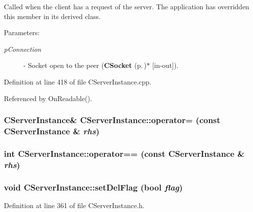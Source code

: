 Called when the client has a request of the server. The application has overridden this member in its derived class.\begin{Desc}
\item[Parameters: ]\par
\begin{description}
\item[{\em 
p\-Connection}]- Socket open to the peer ({\bf CSocket} {\rm (p.\,\pageref{classCSocket})}$\ast$ [in-out]). \end{description}
\end{Desc}


Definition at line 418 of file CServer\-Instance.cpp.

Referenced by On\-Readable().
\subsubsection{\setlength{\rightskip}{0pt plus 5cm}CServer\-Instance\& CServer\-Instance::operator= (const CServer\-Instance \& {\em rhs})\hspace{0.3cm}{\tt  [private]}}\label{classCServerInstance_c1}


\subsubsection{\setlength{\rightskip}{0pt plus 5cm}int CServer\-Instance::operator== (const CServer\-Instance \& {\em rhs})\hspace{0.3cm}{\tt  [private]}}\label{classCServerInstance_c2}


\subsubsection{\setlength{\rightskip}{0pt plus 5cm}void CServer\-Instance::set\-Del\-Flag (bool {\em flag})\hspace{0.3cm}{\tt  [inline, protected]}}\label{classCServerInstance_b1}




Definition at line 361 of file CServer\-Instance.h.

